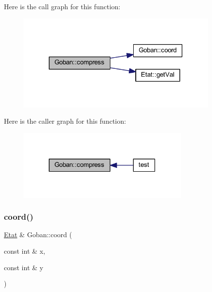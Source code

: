 Here is the call graph for this function\+:
\nopagebreak
\begin{figure}[H]
\begin{center}
\leavevmode
\includegraphics[width=285pt]{class_goban_a8ad67a618a510bb378d00281228b1b13_cgraph}
\end{center}
\end{figure}
Here is the caller graph for this function\+:
\nopagebreak
\begin{figure}[H]
\begin{center}
\leavevmode
\includegraphics[width=243pt]{class_goban_a8ad67a618a510bb378d00281228b1b13_icgraph}
\end{center}
\end{figure}
\mbox{\label{class_goban_a29aaf8df380fe614845d48cba057747c}} 
\subsubsection{\texorpdfstring{coord()}{coord()}\hspace{0.1cm}{\footnotesize\ttfamily [1/2]}}
{\footnotesize\ttfamily \hyperlink{class_etat}{Etat} \& Goban\+::coord (\begin{DoxyParamCaption}\item[{const int \&}]{x,  }\item[{const int \&}]{y }\end{DoxyParamCaption})}

